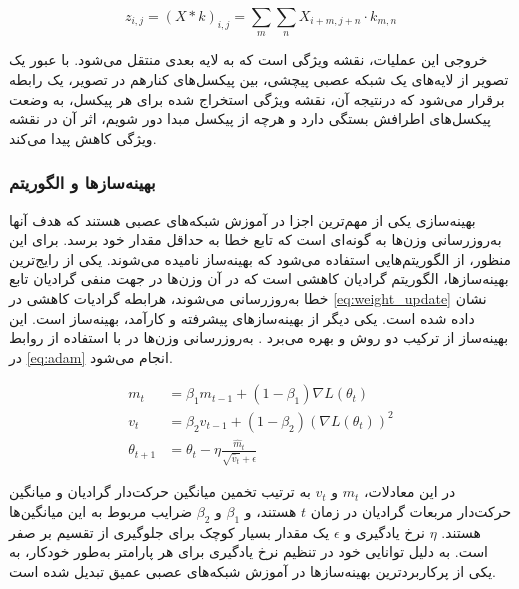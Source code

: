 \begin{latin}
\begin{equation}
\label{eq:convolution}
z_{i,j} = (X * k)_{i,j} = \sum_{m}\sum_{n} X_{i+m,j+n} \cdot k_{m,n}
\end{equation}
\end{latin}

خروجی این عملیات، نقشه ویژگی
 است که به لایه بعدی منتقل می‌شود. با عبور یک تصویر از لایه‌های یک شبکه عصبی پیچشی، بین پیکسل‌های کنارهم در تصویر، یک رابطه برقرار می‌شود که درنتیجه آن، نقشه ویژگی استخراج شده برای هر پیکسل،‌ به وضعت پیکسل‌های اطرافش بستگی دارد و هرچه از پیکسل مبدا دور شویم، اثر آن در نقشه ویژگی کاهش پیدا می‌کند.
 
 




\subsubsection{بهینه‌سازها و الگوریتم 
}

بهینه‌سازی یکی از مهم‌ترین اجزا در آموزش شبکه‌های عصبی هستند که هدف آنها به‌روزرسانی وزن‌ها به گونه‌ای است که تابع خطا به حداقل مقدار خود برسد. برای این منظور، از الگوریتم‌هایی استفاده می‌شود که بهینه‌ساز نامیده می‌شوند. 
یکی از رایج‌ترین بهینه‌سازها، الگوریتم گرادیان کاهشی است که در آن وزن‌ها در جهت منفی گرادیان تابع خطا به‌روزرسانی می‌شوند، هرابطه گرادیات کاهشی در \autoref{eq:weight_update} نشان داده شده است. 
 یکی دیگر از بهینه‌سازهای پیشرفته و کارآمد، بهینه‌ساز 
 است. این بهینه‌ساز از ترکیب دو روش
 و
 بهره می‌برد 
 \cite{towardsdatascienceUnderstandingDeep,mediumMomentumRMSpropAdam}.
  به‌روزرسانی وزن‌ها در  با استفاده از روابط در 
  \autoref{eq:adam}
  انجام می‌شود.

\begin{latin}
\begin{equation}
\label{eq:adam}
\begin{aligned}
m_t &= \beta_1 m_{t-1} + (1 - \beta_1) \nabla L(\theta_t)\\
v_t &= \beta_2 v_{t-1} + (1 - \beta_2) (\nabla L(\theta_t))^2\\
\theta_{t+1} &= \theta_t - \eta \frac{\hat{m}_t}{\sqrt{\hat{v}_t} + \epsilon}
\end{aligned}
\end{equation}
\end{latin}


در این معادلات، \(m_t\) و \(v_t\) به ترتیب تخمین میانگین حرکت‌دار گرادیان و میانگین حرکت‌دار مربعات گرادیان در زمان \(t\) هستند، و \(\beta_1\) و \(\beta_2\) ضرایب مربوط به این میانگین‌ها هستند. \(\eta\) نرخ یادگیری و \(\epsilon\) یک مقدار بسیار کوچک برای جلوگیری از تقسیم بر صفر است. 
 به دلیل توانایی خود در تنظیم نرخ یادگیری برای هر پارامتر به‌طور خودکار، به یکی از پرکاربردترین بهینه‌سازها در آموزش شبکه‌های عصبی عمیق تبدیل شده است. 
